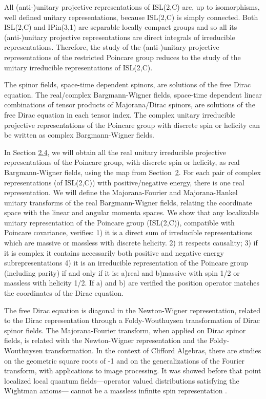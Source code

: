 \documentclass[11pt]{book}
\begin{document}
All (anti-)unitary projective representations of ISL(2,C) are, up to
isomorphisms, well defined unitary representations, because ISL(2,C) is
simply connected\cite{Weinberg1995quantum}. Both ISL(2,C) and IPin(3,1) are separable locally compact groups
and so all its (anti-)unitary projective representations are direct
integrals of irreducible
representations\cite{Henrichs1979On}.
Therefore, the study of the (anti-)unitary projective representations of
the restricted Poincare group reduces to the study of the unitary
irreducible representations of ISL(2,C).

The spinor fields, space-time dependent spinors, are solutions of the
free Dirac equation\cite{Dirac1928quantum}. The real/complex Bargmann-Wigner
fields\cite{Bargmann1948Group}\cite{Huang2002Wavefunctions}, space-time dependent linear combinations of tensor products of
Majorana/Dirac spinors, are solutions of the free Dirac equation in each
tensor index. The complex unitary irreducible projective representations
of the Poincare group with discrete spin or helicity can be written as
complex Bargmann-Wigner fields.

In Section \protect\hyperlink{section:Unitary}{2.4}, we will obtain all
the real unitary irreducible projective representations of the Poincare
group, with discrete spin or helicity, as real Bargmann-Wigner fields,
using the map from Section~\protect\hyperlink{section:Systems}{2}. For
each pair of complex representations (of ISL(2,C)) with
positive/negative energy, there is one real representation. We will
define the Majorana-Fourier and Majorana-Hankel unitary transforms of
the real Bargmann-Wigner fields, relating the coordinate space with the
linear and angular momenta spaces. We show that any localizable unitary
representation of the Poincare group (ISL(2,C)), compatible with
Poincare covariance, verifies: 1) it is a direct sum of irreducible
representations which are massive or massless with discrete helicity. 2)
it respects causality; 3) if it is complex it contains necessarily both
positive and negative energy subrepresentations 4) it is an irreducible
representation of the Poincare group (including parity) if and only if
it is: a)real and b)massive with spin 1/2 or massless with helicity 1/2.
If a) and b) are verified the position operator matches the coordinates
of the Dirac equation.

The free Dirac equation is diagonal in the Newton-Wigner
representation\cite{Newton1949Localized}, related to the Dirac representation through a
Foldy-Wouthuysen
transformation\cite{Costella1995Foldy}\cite{Foldy1950On} of Dirac spinor fields. The Majorana-Fourier
transform, when applied on Dirac spinor fields, is related with the
Newton-Wigner representation and the Foldy-Wouthuysen transformation. In
the context of Clifford Algebras, there are studies on the geometric
square roots of -1 \cite{Hitzer2013Square} and on the generalizations of the Fourier
transform\cite{De2012Clifford}, with
applications to image
processing\cite{Batard2010Clifford}. It was showed before that point localized local quantum
fields---operator valued distributions satisfying the Wightman axioms---
cannot be a massless infinite spin representation
\cite{Yngvason1970Zero}.
\end{document}
